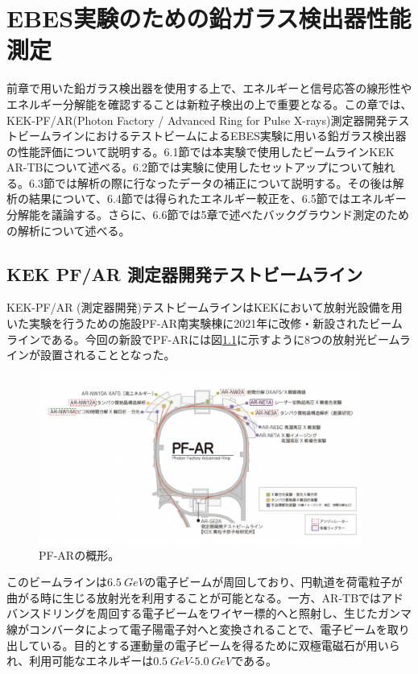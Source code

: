 
\chapter{EBES実験のための鉛ガラス検出器性能測定} \label{sec:CalibrationAnalysis}

前章で用いた鉛ガラス検出器を使用する上で、エネルギーと信号応答の線形性やエネルギー分解能を確認することは新粒子検出の上で重要となる。この章では、KEK-PF/AR(Photon Factory / Advanced Ring for Pulse X-rays)測定器開発テストビームラインにおけるテストビームによるEBES実験に用いる鉛ガラス検出器の性能評価について説明する。6.1節では本実験で使用したビームラインKEK AR-TBについて述べる。6.2節では実験に使用したセットアップについて触れる。6.3節では解析の際に行なったデータの補正について説明する。その後は解析の結果について、6.4節では得られたエネルギー較正を、6.5節ではエネルギー分解能を議論する。さらに、6.6節では5章で述べたバックグラウンド測定のための解析について述べる。

\section{KEK PF/AR 測定器開発テストビームライン}
KEK-PF/AR (測定器開発)テストビームラインはKEKにおいて放射光設備を用いた実験を行うための施設PF-AR南実験棟に2021年に改修・新設されたビームラインである。今回の新設でPF-ARには図\ref{PF-AR}に示すように8つの放射光ビームラインが設置されることとなった。

\begin{figure}[h]
	\begin{center}
		\includegraphics[width=300pt]{./Figure/EBESAnalysis/PFAR.png}
		\caption[PF-ARの概形]{PF-ARの概形。}
		\label{PF-AR}
	\end{center}
\end{figure}


このビームラインは$\SI{6.5}{GeV}$の電子ビームが周回しており、円軌道を荷電粒子が曲がる時に生じる放射光を利用することが可能となる。一方、AR-TBではアドバンスドリングを周回する電子ビームをワイヤー標的へと照射し、生じたガンマ線がコンバータによって電子陽電子対へと変換されることで、電子ビームを取り出している。目的とする運動量の電子ビームを得るために双極電磁石が用いられ、利用可能なエネルギーは$\SI{0.5}{GeV}$-$\SI{5.0}{GeV}$である。

